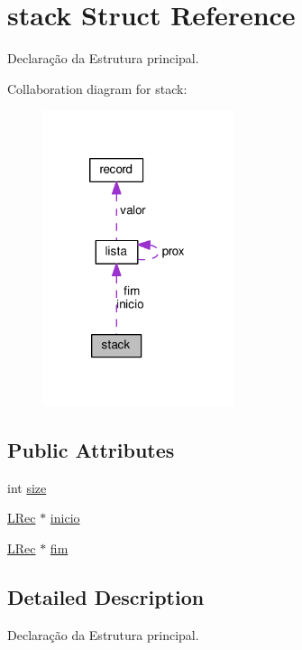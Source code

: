 \hypertarget{structstack}{\section{stack Struct Reference}
\label{structstack}
}


Declaração da Estrutura principal.  




Collaboration diagram for stack\+:
\nopagebreak
\begin{figure}[H]
\begin{center}
\leavevmode
\includegraphics[width=158pt]{structstack__coll__graph}
\end{center}
\end{figure}
\subsection*{Public Attributes}
\begin{DoxyCompactItemize}
\item 
int \hyperlink{structstack_a926a597bae913d1bf4772be35c14b71e}{size}
\item 
\hyperlink{stack_8c_ab3843315393c74d2ade69877ac22d661}{L\+Rec} $\ast$ \hyperlink{structstack_ab847cafd4234504d5eed198cf88cbbf8}{inicio}
\item 
\hyperlink{stack_8c_ab3843315393c74d2ade69877ac22d661}{L\+Rec} $\ast$ \hyperlink{structstack_a802d8229341bbd71d5ef20c499753070}{fim}
\end{DoxyCompactItemize}


\subsection{Detailed Description}
Declaração da Estrutura principal. 

